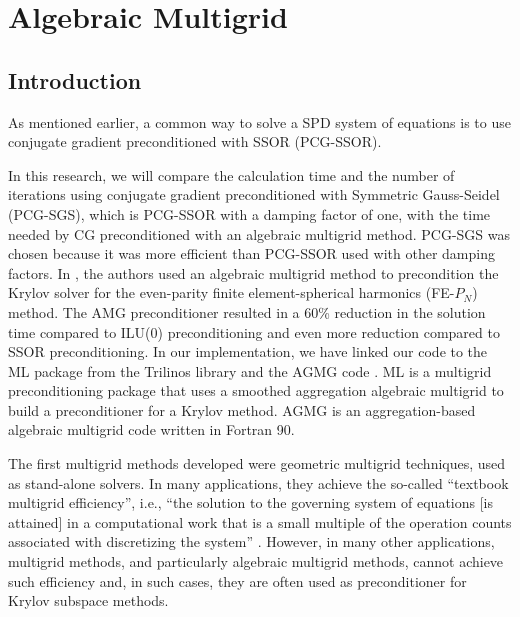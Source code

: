 \section{Algebraic Multigrid} \label{sec_amg}
\subsection{Introduction}
As mentioned earlier, a common way to solve a SPD system of equations is to use
conjugate gradient preconditioned with SSOR (PCG-SSOR). {In this research, we
will compare the calculation time and the number of iterations using conjugate 
gradient preconditioned with
Symmetric Gauss-Seidel (PCG-SGS), which is PCG-SSOR with a
damping factor of one, with the time needed by CG preconditioned with an
algebraic multigrid method. PCG-SGS was chosen because it was more efficient
than PCG-SSOR used with other damping factors. In \cite{amg_pn}, the authors 
used an algebraic multigrid method to precondition the Krylov solver for the 
even-parity finite element-spherical harmonics (FE-$P_N$) method. The AMG 
preconditioner resulted in a 60\% reduction in the solution time compared to 
ILU(0) preconditioning and even more reduction compared to SSOR preconditioning. 
In our implementation, we have linked our code to the ML package 
\cite{ml_guide} from the Trilinos library and the AGMG code \cite{agmg_guide}. 
ML is a multigrid preconditioning package that uses a smoothed aggregation 
algebraic multigrid to build a preconditioner for a Krylov method. AGMG is an 
aggregation-based algebraic multigrid code written in Fortran 90.

The first multigrid methods developed were geometric multigrid techniques, used as 
stand-alone solvers. In many applications, they achieve the so-called 
``textbook multigrid efficiency'', i.e., ``the solution to the governing 
system of equations [is attained] in a computational work that is a small 
multiple of the operation counts associated with discretizing the system'' 
\cite{textbook_eff}. However, in many other applications, multigrid methods, 
and particularly algebraic multigrid methods, cannot achieve such efficiency 
\cite{k_cycle} and, in such cases, they are often used as preconditioner for 
Krylov subspace methods. 

}
